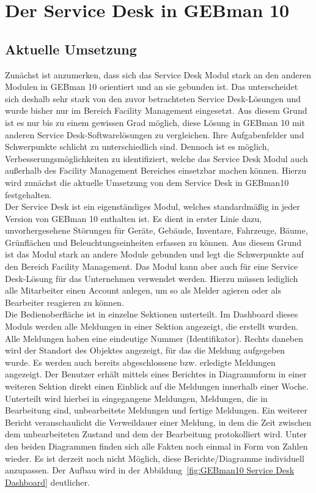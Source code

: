 
\section{Der Service Desk in GEBman 10}

\subsection{Aktuelle Umsetzung}
\noindent
Zunächst ist anzumerken, dass sich das Service Desk Modul stark an den anderen Modulen in GEBman 10 orientiert und an sie gebunden ist. Das unterscheidet sich deshalb sehr stark von den zuvor betrachteten Service Desk-Lösungen und wurde bisher nur im Bereich Facility Management eingesetzt. Aus diesem Grund ist es nur bis zu einem gewissen Grad möglich, diese Lösung in GEBman 10 mit anderen Service Desk-Softwarelösungen zu vergleichen. Ihre Aufgabenfelder und Schwerpunkte schlicht zu unterschiedlich sind. Dennoch ist es möglich, Verbesserungsmöglichkeiten zu identifiziert, welche das Service Desk Modul auch außerhalb des Facility Management Bereiches einsetzbar machen können. Hierzu wird zunächst die aktuelle Umsetzung von dem Service Desk in GEBman10 festgehalten.\\

\noindent
Der Service Desk  ist ein eigenständiges Modul, welches standardmäßig in jeder Version von GEBman 10 enthalten ist. Es dient in erster Linie dazu, unvorhergesehene Störungen für Geräte, Gebäude, Inventare, Fahrzeuge, Bäume, Grünflächen und Beleuchtungseinheiten erfassen zu können. Aus diesem Grund ist das Modul stark an andere Module gebunden und legt die Schwerpunkte auf den Bereich Facility Management. Das Modul kann aber auch für eine Service Desk-Lösung für das Unternehmen verwendet werden. Hierzu müssen lediglich alle Mitarbeiter einen Account anlegen, um so als Melder agieren oder als Bearbeiter reagieren zu können.\\

\noindent 
Die Bedienoberfläche ist in einzelne Sektionen unterteilt. Im Dashboard dieses Moduls werden alle Meldungen in einer Sektion angezeigt, die erstellt wurden. Alle Meldungen haben eine eindeutige Nummer (Identifikator). Rechts daneben wird der Standort des Objektes angezeigt, für das die Meldung aufgegeben wurde. Es werden auch bereits abgeschlossene bzw. erledigte Meldungen angezeigt. Der Benutzer erhält mittels eines Berichtes in Diagrammform in einer weiteren Sektion direkt einen Einblick auf die Meldungen innerhalb einer Woche. Unterteilt wird hierbei in eingegangene Meldungen, Meldungen, die in Bearbeitung sind, unbearbeitete Meldungen und fertige Meldungen. Ein weiterer Bericht veranschaulicht die Verweildauer einer Meldung, in dem die Zeit zwischen dem unbearbeiteten Zustand und dem der Bearbeitung protokolliert wird. Unter den beiden Diagrammen finden sich alle Fakten noch einmal in Form von Zahlen wieder. Es ist derzeit noch nicht Möglich, diese Berichte/Diagramme individuell anzupassen. Der Aufbau wird in der Abbildung~\ref{fig:GEBman10 Service Desk Dashboard} deutlicher. \\ 


